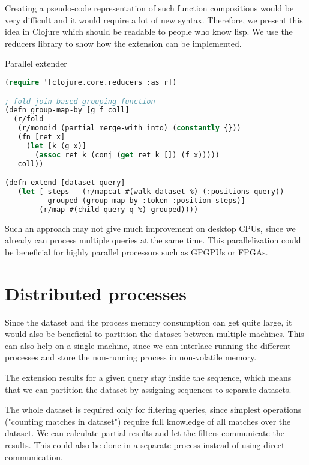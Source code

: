Creating a pseudo-code representation of such function compositions would be very difficult and it would require a lot of new syntax. Therefore, we present this idea in Clojure\cite{clojure} which should be readable to people who know lisp. We use the reducers library to show how the extension can be implemented.

\begin{algorithm}[H]
	\caption{Parallel extender}
\begin{lstlisting}[language=Lisp]
(require '[clojure.core.reducers :as r])

; fold-join based grouping function
(defn group-map-by [g f coll]
  (r/fold 
   (r/monoid (partial merge-with into) (constantly {}))
   (fn [ret x]
     (let [k (g x)]
       (assoc ret k (conj (get ret k []) (f x)))))
   coll))

(defn extend [dataset query]
   (let [ steps   (r/mapcat #(walk dataset %) (:positions query))
          grouped (group-map-by :token :position steps)]
        (r/map #(child-query q %) grouped))))
\end{lstlisting}
\end{algorithm}

Such an approach may not give much improvement on desktop CPUs, since we already can process multiple queries at the same time. This parallelization could be beneficial for highly parallel processors such as GPGPUs or FPGAs.

\section{Distributed processes}

Since the dataset and the process memory consumption can get quite large, it would also be beneficial to partition the dataset between multiple machines. This can also help on a single machine, since we can interlace running the different processes and store the non-running process in non-volatile memory.

The extension results for a given query stay inside the sequence, which means that we can partition the dataset by assigning sequences to separate datasets.

The whole dataset is required only for filtering queries, since simplest operations ("counting matches in dataset") require full knowledge of all matches over the dataset. We can calculate partial results and let the filters communicate the results. This could also be done in a separate process instead of using direct communication.

